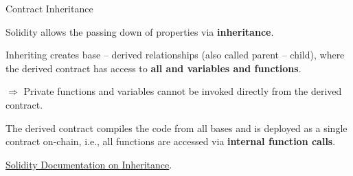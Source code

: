 \documentclass[handout]{beamer}
\begin{document}
\begin{frame}{Contract Inheritance}

\vspace{0.5em}

\begin{minipage}{0.35\textwidth}
	\begin{figure}[t]
		\centering
		\begin{tikzpicture}[scale=0.9, every node/.style={scale=0.9}]
			
		\end{tikzpicture}
	\end{figure}
\end{minipage}
\begin{minipage}{0.63\textwidth}
	Solidity allows the passing down of properties via \textbf{inheritance}.

	\vspace{0.5em}

	Inheriting creates base – derived relationships (also called parent – child), where the derived contract has access to \textbf{all  and  variables and functions}.
	
	\vspace{0.5em}

	$\Rightarrow$ Private functions and variables cannot be invoked directly from the derived contract.

\end{minipage}

\vspace{1em}

	The derived contract compiles the code from all bases and is deployed as a single contract on-chain, i.e.,  all functions are accessed via \textbf{internal function calls}. 

\vspace{1.5em}

\link \href{https://docs.soliditylang.org/en/latest/contracts.html\#inheritance}{Solidity Documentation on Inheritance}.

\end{frame}
\end{document}
